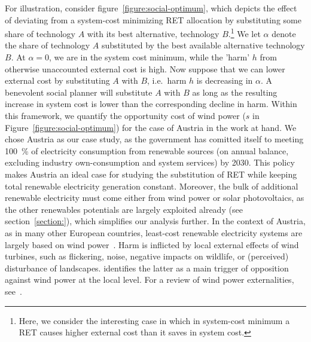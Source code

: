 \documentclass[final, 3p, times]{elsarticle} %
\begin{document}
    For illustration, consider figure~\ref{figure:social-optimum}, which depicts the effect of deviating from a
    system-cost minimizing RET allocation by substituting some share of technology $A$ with its best alternative,
    technology $B$.\footnote{Here, we consider the interesting case in which in system-cost minimum a RET causes higher
    external cost than it saves in system cost.}
    We let $\alpha$ denote the share of technology $A$ substituted by the best available alternative technology $B$.
    At $\alpha=0$, we are in the system cost minimum, while the 'harm' $h$ from otherwise unaccounted external cost is
    high.
    Now suppose that we can lower external cost by substituting $A$ with $B$, i.e.\ harm $h$ is decreasing in $\alpha$.
    A benevolent social planner will substitute $A$ with $B$ as long as the resulting increase in system cost is lower
    than the corresponding decline in harm.
    \bigskip
    Within this framework, we quantify the opportunity cost of wind power ($s$ in Figure~\ref{figure:social-optimum})
    for the case of Austria in the work at hand.
    We chose Austria as our case study, as the government has comitted itself to meeting \SI{100}{\percent} of
    electricity consumption from renewable sources (on annual balance, excluding industry own-consumption and system
    services) by 2030.
    This policy makes Austria an ideal case for studying the substitution of RET while keeping total renewable
    electricity generation constant.
    Moreover, the bulk of additional renewable electricity must come either from wind power or solar photovoltaics, as
    the other renewables potentials are largely exploited already (see section~\ref{section:}), which simplifies our
    analysis further.
    In the context of Austria, as in many other European countries, least-cost renewable electricity systems are largely
    based on wind power~\citep{Rodriguez2015}. 
    Harm is inflicted by local external effects of wind turbines, such as flickering, noise, negative impacts on
    wildlife, or (perceived) disturbance of landscapes.
    \cite{Mattmann2016} identifies the latter as a main trigger of opposition against wind power at the local level.
    For a review of wind power externalities, see~\cite{Zerrahn2017}.
\end{document}
